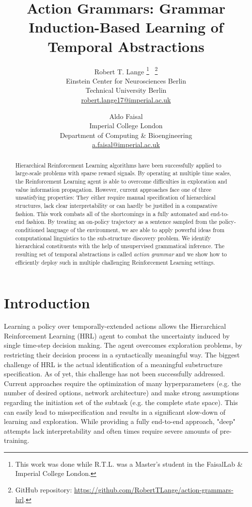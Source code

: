 \documentclass[colorinlistoftodos]{article}
\title{Action Grammars: Grammar Induction-Based Learning of Temporal Abstractions}
\author{
  Robert T. Lange \thanks{This work was done while R.T.L. was a Master's student in the FaisalLab \& Imperial College London.} \ \thanks{GitHub repository: \url{https://github.com/RobertTLange/action-grammars-hrl}.} \\
  Einstein Center for Neurosciences Berlin\\
  Technical University Berlin\\
  \url{robert.lange17@imperial.ac.uk} \\
	\and 
  Aldo Faisal \\
  Imperial College London \\
  Department of Computing \& Bioengineering\\
  \url{a.faisal@imperial.ac.uk} \\
}
\theoremstyle{definition}
\begin{document}
\maketitle

\begin{abstract}
Hierarchical Reinforcement Learning algorithms have been successfully applied to large-scale problems with sparse reward signals. By operating at multiple time scales, the Reinforcement Learning agent is able to overcome difficulties in exploration and value information propagation. However, current approaches face one of three unsatisfying properties: They either require manual specification of hierarchical structures, lack clear interpretability or can hardly be justified in a comparative fashion.
This work combats all of the shortcomings in a fully automated and end-to-end fashion. By treating an on-policy trajectory as a sentence sampled from the policy-conditioned language of the environment, we are able to apply powerful ideas from computational linguistics to the sub-structure discovery problem.
We identify hierarchical constituents with the help of unsupervised grammatical inference. The resulting set of temporal abstractions is called \textit{action grammar} and we show how to efficiently deploy such in multiple challenging Reinforcement Learning settings.
\end{abstract}

\section{Introduction}\label{ch1:intro}

Learning a policy over temporally-extended actions allows the Hierarchical Reinforcement Learning (HRL) agent to combat the uncertainty induced by single time-step decision making. The agent overcomes exploration problems, by restricting their decision process in a syntactically meaningful way.
The biggest challenge of HRL is the actual identification of a meaningful substructure specification. As of yet, this challenge has not been successfully addressed. Current approaches require the optimization of many hyperparameters (e.g. the number of desired options, network architecture) and make strong assumptions regarding the initiation set of the subtask (e.g. the complete state space). This can easily lead to misspecification and results in a significant slow-down of learning and exploration. While providing a fully end-to-end approach, "deep" attempts lack interpretability and often times require severe amounts of pre-training. 
\end{document}
